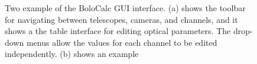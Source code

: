 \begin{figure}
    \centering
    \hfill
    \caption{Two example of the BoloCalc GUI interface. (a) shows the toolbar for navigating between telescopes, cameras, and channels, and it shows a the table interface for editing optical parameters. The drop-down menus allow the values for each channel to be edited independently. (b) shows an example }
    \label{fig:bcg}
\end{figure}

